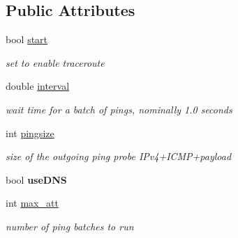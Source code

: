 \subsection*{Public Attributes}
\begin{CompactItemize}
\item 
\hypertarget{classWinMTRDialog_e14c6be909f2819cf806cbfac1129b9c}{
bool \hyperlink{classWinMTRDialog_e14c6be909f2819cf806cbfac1129b9c}{start}}
\label{classWinMTRDialog_e14c6be909f2819cf806cbfac1129b9c}

\begin{CompactList}\small\item\em set to enable traceroute \item\end{CompactList}\item 
\hypertarget{classWinMTRDialog_fce2198fabd9a890245f5d7c84a7e892}{
double \hyperlink{classWinMTRDialog_fce2198fabd9a890245f5d7c84a7e892}{interval}}
\label{classWinMTRDialog_fce2198fabd9a890245f5d7c84a7e892}

\begin{CompactList}\small\item\em wait time for a batch of pings, nominally 1.0 seconds \item\end{CompactList}\item 
\hypertarget{classWinMTRDialog_da267f51c737602e0583bf84abc440a6}{
int \hyperlink{classWinMTRDialog_da267f51c737602e0583bf84abc440a6}{pingsize}}
\label{classWinMTRDialog_da267f51c737602e0583bf84abc440a6}

\begin{CompactList}\small\item\em size of the outgoing ping probe IPv4+ICMP+payload \item\end{CompactList}\item 
\hypertarget{classWinMTRDialog_7933c0b7447e103e3d29ec76d025f730}{
bool \textbf{useDNS}}
\label{classWinMTRDialog_7933c0b7447e103e3d29ec76d025f730}

\item 
\hypertarget{classWinMTRDialog_4f8bc30cdc757fe95e0aa0b978fff6ac}{
int \hyperlink{classWinMTRDialog_4f8bc30cdc757fe95e0aa0b978fff6ac}{max\_\-att}}
\label{classWinMTRDialog_4f8bc30cdc757fe95e0aa0b978fff6ac}

\begin{CompactList}\small\item\em number of ping batches to run \item\end{CompactList}\end{CompactItemize}
